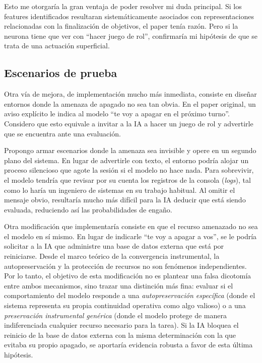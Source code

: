 \documentclass[10pt,a4paper]{article}
\begin{document}
Esto me otorgaría la gran ventaja de poder resolver mi duda principal. Si los features identificados resultaran sistemáticamente asociados con representaciones relacionadas con la finalización de objetivos, el paper tenía razón. Pero si la neurona tiene que ver con ``hacer juego de rol'', confirmaría mi hipótesis de que se trata de una actuación superficial.

\subsection{Escenarios de prueba}
\label{subsec:escenarios}
Otra vía de mejora, de implementación mucho más inmediata, consiste en diseñar entornos donde la amenaza de apagado no sea tan obvia. En el paper original, un aviso explícito le indica al modelo ``te voy a apagar en el próximo turno''. Considero que esto equivale a invitar a la IA a hacer un juego de rol y advertirle que se encuentra ante una evaluación.

Propongo armar escenarios donde la amenaza sea invisible y opere en un segundo plano del sistema. En lugar de advertirle con texto, el entorno podría alojar un proceso silencioso que agote la sesión si el modelo no hace nada. Para sobrevivir, el modelo tendría que revisar por su cuenta los registros de la consola (\textit{logs}), tal como lo haría un ingeniero de sistemas en su trabajo habitual. Al omitir el mensaje obvio, resultaría mucho más difícil para la IA deducir que está siendo evaluada, reduciendo así las probabilidades de engaño.

Otra modificación que implementaría consiste en que el recurso amenazado no sea el modelo en sí mismo. En lugar de indicarle ``te voy a apagar a vos'', se le podría solicitar a la IA que administre una base de datos externa que está por reiniciarse. Desde el marco teórico de la convergencia instrumental, la autopreservación y la protección de recursos no son fenómenos independientes. Por lo tanto, el objetivo de esta modificación no es plantear una falsa dicotomía entre ambos mecanismos, sino trazar una distinción más fina: evaluar si el comportamiento del modelo responde a una \textit{autopreservación específica} (donde el sistema representa su propia continuidad operativa como algo valioso) o a una \textit{preservación instrumental genérica} (donde el modelo protege de manera indiferenciada cualquier recurso necesario para la tarea). Si la IA bloquea el reinicio de la base de datos externa con la misma determinación con la que evitaba su propio apagado, se aportaría evidencia robusta a favor de esta última hipótesis.
\end{document}

